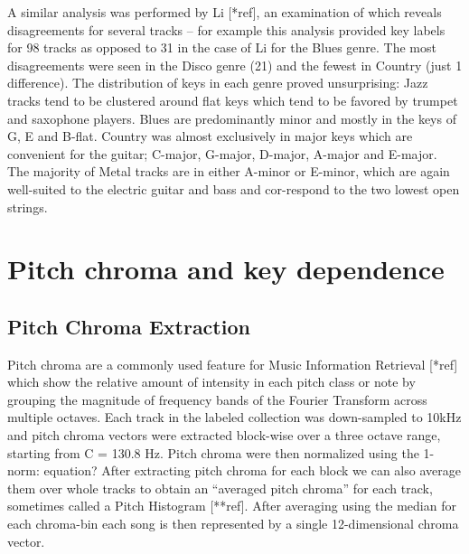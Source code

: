 \documentclass{article}
\begin{document}
A similar analysis was performed by Li [*ref], an examination of which reveals disagreements for several tracks – for example this analysis provided key labels for 98 tracks as opposed to 31 in the case of Li for the Blues genre.  The most disagreements were seen in the Disco genre (21) and the fewest in Country (just 1 difference). The distribution of keys in each genre proved unsurprising: Jazz tracks tend to be clustered around flat keys which tend to be favored by trumpet and saxophone players. Blues are predominantly minor and mostly in the keys of G, E and B-flat. Country was almost exclusively in major keys which are convenient for the guitar; C-major, G-major, D-major, A-major and E-major. The majority of Metal tracks are in either A-minor or E-minor, which are again well-suited to the electric guitar and bass and cor-respond to the two lowest open strings.

\section{Pitch chroma and key dependence}\label{sec:pitch_chroma}

\subsection{Pitch Chroma Extraction}\label{subsec:pc_extract}
Pitch chroma are a commonly used feature for Music Information Retrieval [*ref] which show the relative amount of intensity in each pitch class or note by grouping the magnitude of frequency bands of the Fourier Transform across multiple octaves. Each track in the labeled collection was down-sampled to 10kHz and pitch chroma vectors were extracted block-wise over a three octave range, starting from C = 130.8 Hz. Pitch chroma were then normalized using the 1-norm:                     
	 equation?
After extracting pitch chroma for each block we can also average them over whole tracks to obtain an “averaged pitch chroma” for each track, sometimes called a Pitch Histogram [**ref]. After averaging using the median for each chroma-bin each song is then represented by a single 12-dimensional chroma vector.
\end{document}
